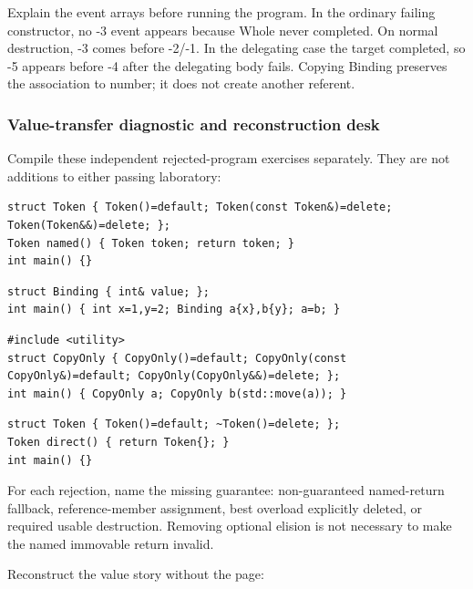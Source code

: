 Explain the event arrays before running the program. In the ordinary failing constructor, no -3 event appears because Whole never completed. On normal destruction, -3 comes before -2/-1. In the delegating case the target completed, so -5 appears before -4 after the delegating body fails. Copying Binding preserves the association to number; it does not create another referent.

\subsubsection{Value-transfer diagnostic and reconstruction desk}\label{value-transfer-diagnostic-and-reconstruction-desk}

Compile these independent rejected-program exercises separately. They are not additions to either passing laboratory:

\begin{verbatim}
struct Token { Token()=default; Token(const Token&)=delete; Token(Token&&)=delete; };
Token named() { Token token; return token; }
int main() {}
\end{verbatim}

\begin{verbatim}
struct Binding { int& value; };
int main() { int x=1,y=2; Binding a{x},b{y}; a=b; }
\end{verbatim}

\begin{verbatim}
#include <utility>
struct CopyOnly { CopyOnly()=default; CopyOnly(const CopyOnly&)=default; CopyOnly(CopyOnly&&)=delete; };
int main() { CopyOnly a; CopyOnly b(std::move(a)); }
\end{verbatim}

\begin{verbatim}
struct Token { Token()=default; ~Token()=delete; };
Token direct() { return Token{}; }
int main() {}
\end{verbatim}

For each rejection, name the missing guarantee: non-guaranteed named-return fallback, reference-member assignment, best overload explicitly deleted, or required usable destruction. Removing optional elision is not necessary to make the named immovable return invalid.

Reconstruct the value story without the page:

